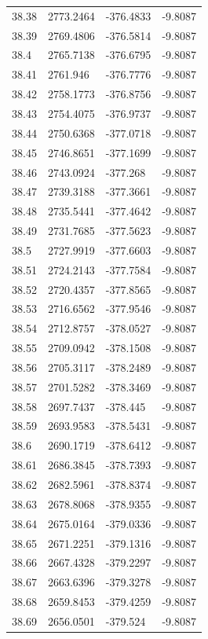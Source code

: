 \begin{table}[H]
\begin{tabular}{llll}
38.38 & 2773.2464 & -376.4833 & -9.8087 \\
38.39 & 2769.4806 & -376.5814 & -9.8087 \\
38.4 & 2765.7138 & -376.6795 & -9.8087 \\
38.41 & 2761.946 & -376.7776 & -9.8087 \\
38.42 & 2758.1773 & -376.8756 & -9.8087 \\
38.43 & 2754.4075 & -376.9737 & -9.8087 \\
38.44 & 2750.6368 & -377.0718 & -9.8087 \\
38.45 & 2746.8651 & -377.1699 & -9.8087 \\
38.46 & 2743.0924 & -377.268 & -9.8087 \\
38.47 & 2739.3188 & -377.3661 & -9.8087 \\
38.48 & 2735.5441 & -377.4642 & -9.8087 \\
38.49 & 2731.7685 & -377.5623 & -9.8087 \\
38.5 & 2727.9919 & -377.6603 & -9.8087 \\
38.51 & 2724.2143 & -377.7584 & -9.8087 \\
38.52 & 2720.4357 & -377.8565 & -9.8087 \\
38.53 & 2716.6562 & -377.9546 & -9.8087 \\
38.54 & 2712.8757 & -378.0527 & -9.8087 \\
38.55 & 2709.0942 & -378.1508 & -9.8087 \\
38.56 & 2705.3117 & -378.2489 & -9.8087 \\
38.57 & 2701.5282 & -378.3469 & -9.8087 \\
38.58 & 2697.7437 & -378.445 & -9.8087 \\
38.59 & 2693.9583 & -378.5431 & -9.8087 \\
38.6 & 2690.1719 & -378.6412 & -9.8087 \\
38.61 & 2686.3845 & -378.7393 & -9.8087 \\
38.62 & 2682.5961 & -378.8374 & -9.8087 \\
38.63 & 2678.8068 & -378.9355 & -9.8087 \\
38.64 & 2675.0164 & -379.0336 & -9.8087 \\
38.65 & 2671.2251 & -379.1316 & -9.8087 \\
38.66 & 2667.4328 & -379.2297 & -9.8087 \\
38.67 & 2663.6396 & -379.3278 & -9.8087 \\
38.68 & 2659.8453 & -379.4259 & -9.8087 \\
38.69 & 2656.0501 & -379.524 & -9.8087 \\

\end{tabular}
\end{table}
